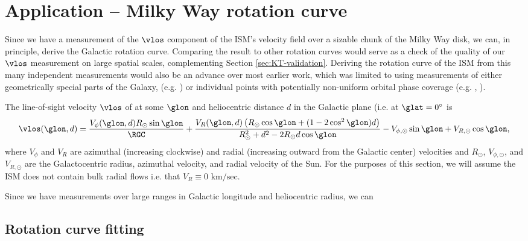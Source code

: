 \section{Application -- Milky Way rotation curve}
\label{sec:rotation_curve}

Since we have a measurement of the $\vlos$ component of the ISM's velocity field over a sizable chunk of the Milky Way disk, we can, in principle, derive the Galactic rotation curve.
Comparing the result to other rotation curves would serve as a check of the quality of our $\vlos$ measurement on large spatial scales, complementing Section \ref{sec:KT-validation}.
Deriving the rotation curve of the ISM from this many independent measurements would also be an advance over most earlier work, which was limited to using measurements of either geometrically special parts of the Galaxy, (e.g. \Clemens) or individual points with potentially non-uniform orbital phase coverage (e.g. \citealt{Reid:2009jb}, \Reid). 

The line-of-sight velocity $\vlos$ of at some $\glon$ and heliocentric distance $d$ in the Galactic plane (i.e. at $\glat=0^\circ$ is 
\begin{equation}
\label{eqn:vlos_complete}
\vlos(\glon, d) = \frac{V_\phi (\glon, d) R_\odot \sin\glon}{\RGC} + 
\frac{V_R (\glon, d) \left(R_\odot \cos \glon + (1 - 2 \cos^2 \glon) d  \right) }{R^2_\odot + d^2 - 2 R_\odot d \cos \glon} - V_{\phi, \odot} \sin \glon + V_{R, \odot} \cos \glon,
\end{equation}
where $V_\phi$ and $V_R$ are azimuthal (increasing clockwise) and radial (increasing outward from the Galactic center) velocities and $R_\odot$, $V_{\phi, \odot}$, and $V_{R, \odot}$ are the Galactocentric radius, azimuthal velocity, and radial velocity of the Sun. 
For the purposes of this section, we will assume the ISM does not contain bulk radial flows i.e. that $V_R \equiv 0 \text{ km/sec}$. 

Since we have measurements over large ranges in Galactic longitude and heliocentric radius, we can 

\subsection{Rotation curve fitting}

